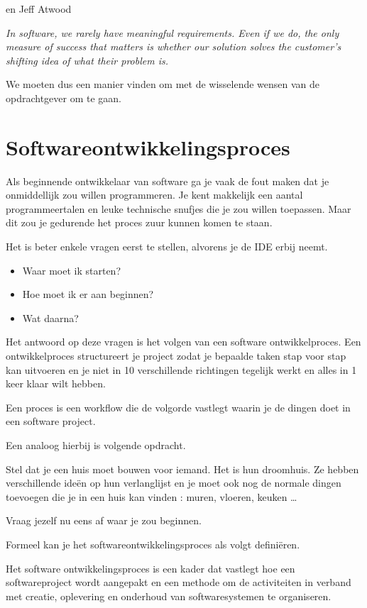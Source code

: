en Jeff Atwood
\begin{center}
\textit{In software, we rarely have meaningful requirements.  Even if we do, the only measure of success that matters is whether our solution solves the customer's shifting idea of what their problem is.}
\end{center}

We moeten dus een manier vinden om met de wisselende wensen van de opdrachtgever om te gaan.


\section{Softwareontwikkelingsproces}
Als beginnende ontwikkelaar van software ga je vaak de fout maken dat je onmiddellijk zou willen programmeren. Je kent makkelijk een aantal programmeertalen en leuke technische snufjes die je zou willen toepassen. Maar dit zou je gedurende het proces zuur kunnen komen te staan. 

Het is beter enkele vragen eerst te stellen, alvorens je de IDE erbij neemt.
\begin{itemize}
	\item Waar moet ik starten?
	\item Hoe moet ik er aan beginnen?
	\item Wat daarna?
\end{itemize}

Het antwoord op deze vragen is het volgen van een software ontwikkelproces. Een ontwikkelproces structureert je project zodat je bepaalde taken stap voor stap kan uitvoeren en je niet in 10 verschillende richtingen tegelijk werkt en alles in 1 keer klaar wilt hebben.

Een proces is een workflow die de volgorde vastlegt waarin je de dingen doet in een software project. 

Een analoog hierbij is volgende opdracht.

\begin{exercise}
Stel dat je een huis moet bouwen voor iemand. Het is hun droomhuis.  Ze hebben verschillende ide\"en op hun verlanglijst en je moet ook nog de normale dingen toevoegen die je in een huis kan vinden : muren, vloeren, keuken \dots

Vraag jezelf nu eens af waar je zou beginnen.
\end{exercise}

Formeel kan je het softwareontwikkelingsproces als volgt defini\"eren.
\begin{definition}
	Het software ontwikkelingsproces is  een kader dat vastlegt hoe een softwareproject wordt aangepakt en 
een methode om de activiteiten in verband met creatie, oplevering en onderhoud van softwaresystemen te organiseren.
\end{definition}

